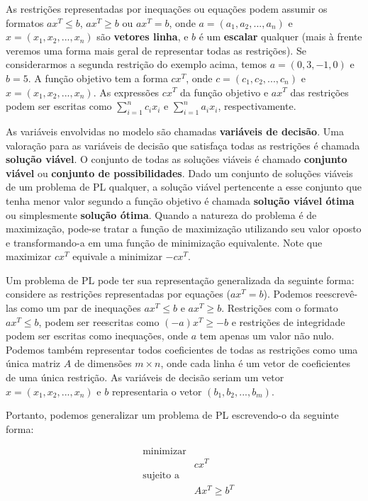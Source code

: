 As restrições representadas por inequações ou equações podem assumir os formatos $ax^T \leq b$, $ax^T \geq b$ ou $ax^T = b$, onde $a = (a_1, a_2, ..., a_n)$ e $x = (x_1, x_2, ..., x_n)$ são \textbf{vetores linha}, e $b$ é um \textbf{escalar} qualquer (mais à frente veremos uma forma mais geral de representar todas as restrições). Se considerarmos a segunda restrição do exemplo acima, temos $a = (0, 3, -1, 0)$ e $b = 5$. A função objetivo tem a forma $cx^T$, onde $c = (c_1, c_2, ..., c_n)$ e $x = (x_1, x_2, ..., x_n)$. As expressões $cx^T$ da função objetivo e $ax^T$ das restrições podem ser escritas como $\sum_{i = 1}^n c_ix_i$ e $\sum_{i = 1}^n a_ix_i$, respectivamente.

As variáveis envolvidas no modelo são chamadas \textbf{variáveis de decisão}. Uma valoração para as variáveis de decisão que satisfaça todas as restrições é chamada \textbf{solução viável}. O conjunto de todas as soluções viáveis é chamado \textbf{conjunto viável} ou \textbf{conjunto de possibilidades}. Dado um conjunto de soluções viáveis de um problema de PL qualquer, a solução viável  pertencente a esse conjunto que tenha menor valor segundo a função objetivo é chamada \textbf{solução viável ótima} ou simplesmente \textbf{solução ótima}. Quando a natureza do problema é de maximização, pode-se tratar a função de maximização utilizando seu valor oposto e transformando-a em uma função de minimização equivalente. Note que maximizar $cx^T$ equivale a minimizar $-cx^T$.

Um problema de PL pode ter sua representação generalizada da seguinte forma: considere as restrições representadas por equações ($ax^T = b$). Podemos reescrevê-las como um par de inequações $ax^T \leq b$ e $ax^T \geq b$. Restrições com o formato $ax^T \leq b$, podem ser reescritas como $(-a)x^T \geq -b$ e restrições de integridade podem ser escritas como inequações, onde $a$ tem apenas um valor não nulo. Podemos também representar todos coeficientes de todas as restrições como uma única matriz $A$ de dimensões $m \times n$, onde cada linha é um vetor de coeficientes de uma única restrição. As variáveis de decisão seriam um vetor $x = (x_1, x_2, ..., x_n)$ e $b$ representaria o vetor $(b_1, b_2, ..., b_m)$. 

Portanto, podemos generalizar um problema de PL escrevendo-o da seguinte forma:

\begin{equation*}
\begin{aligned}
& \text{minimizar} \\
& &  cx^T \\
& \text{sujeito a} \\
& & Ax^T \geq b^T 
\end{aligned}
\end{equation*}

